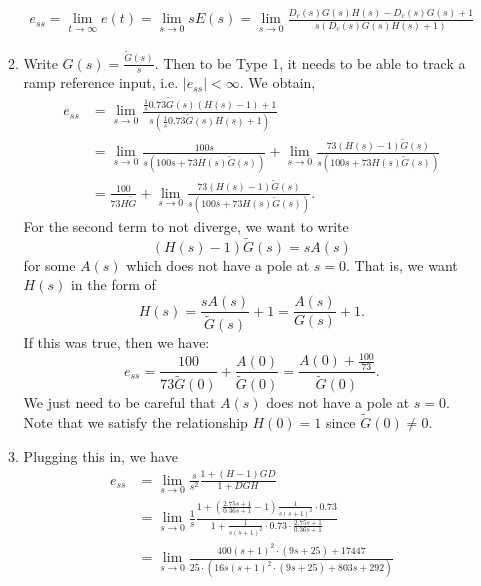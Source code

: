 \documentclass{article}
\numberwithin{equation}{section}
\begin{document}
\begin{enumerate}[label=\textbf{2.\arabic*}]
\begin{enumerate}[label=(\alph*)]
\begin{align}
            e_{ss} = \lim_{t\to \infty}e(t) = \lim_{s\to 0} sE(s) = \lim_{s\to 0} \frac{D_c(s)G(s)H(s) - D_c(s)G(s) + 1}{s(D_c(s)G(s)H(s) + 1)}
        \end{align}
        \item Write $G(s) = \frac{\tilde{G}(s)}{s}.$ Then to be Type 1, it needs to be able to track a ramp reference input, i.e. $|e_{ss}| < \infty.$ We obtain,
        \begin{align}
            e_{ss} &= \lim_{s\to 0} \frac{\frac{1}{s}0.73 \tilde{G}(s) (H(s) - 1) + 1}{s(\frac{1}{s}0.73 \tilde{G}(s) H(s) + 1)} \\ 
            &= \lim_{s\to 0}\frac{100 s}{s (100 s + 73 H{(s)} \tilde{G}{(s)})}  + \lim_{s\to 0}\frac{73 (H{(s)} - 1) \tilde{G}{(s)}}{s (100 s + 73 H{(s)} \tilde{G}{(s)})}\\
            &= \frac{100}{73H\tilde{G}} + \lim_{s\to 0}\frac{73 (H{(s)} - 1) \tilde{G}{(s)}}{s (100 s + 73 H{(s)} \tilde{G}{(s)})}.
        \end{align}
        For the second term to not diverge, we want to write
        \begin{equation}
            (H(s)-1)\tilde{G}(s) = sA(s)
        \end{equation}
        for some $A(s)$ which does not have a pole at $s=0.$ That is, we want $H(s)$ in the form of 
        \begin{equation}
            H(s) = \frac{s A(s)}{\tilde{G}(s)} + 1 = \frac{A(s)}{G(s)} + 1.
        \end{equation}
        If this was true, then we have:
        \begin{equation}
            e_{ss} = \frac{100}{73\tilde{G}(0)} + \frac{A(0)}{\tilde{G}(0)} = \frac{A{(0)} + \frac{100}{73}}{\tilde{G}{(0)}}.
        \end{equation}
        We just need to be careful that $A(s)$ does not have a pole at $s=0.$ Note that we satisfy the relationship $H(0) = 1$ since $\tilde{G}(0) \neq 0.$
        \item Plugging this in, we have 
        \begin{align}
            e_{ss} &= \lim_{s\to 0} \frac{s}{s^2} \frac{1+(H-1)GD}{1+DGH} \\ 
            &= \lim_{s\to 0} \frac{1}{s}\frac{1 + \left(\frac{2.75s+1}{0.36s+1} -1\right)\frac{1}{s(s+1)^2} \cdot 0.73}{1 + \frac{1}{s(s+1)^2} \cdot 0.73 \cdot \frac{2.75s+1}{0.36s+1}} \\ 
            &= \lim_{s\to 0}\frac{400 (s + 1)^{2} \cdot (9 s + 25) + 17447}{25 \cdot (16 s (s + 1)^{2} \cdot (9 s + 25) + 803 s + 292)} \\ 

\end{align}
\end{enumerate}
\end{enumerate}
\end{document}
